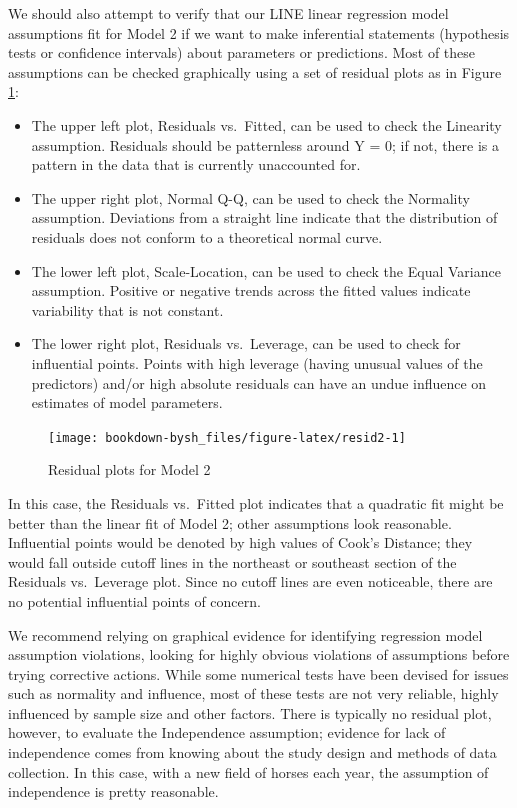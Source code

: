\documentclass[
]{krantz}
\providecommand{\tightlist}{%
  \setlength{\itemsep}{0pt}\setlength{\parskip}{0pt}}
\begin{document}
We should also attempt to verify that our LINE linear regression model assumptions fit for Model 2 if we want to make inferential statements (hypothesis tests or confidence intervals) about parameters or predictions. Most of these assumptions can be checked graphically using a set of residual plots as in Figure \ref{fig:resid2}:

\begin{itemize}
\tightlist
\item
  The upper left plot, Residuals vs.~Fitted, can be used to check the Linearity assumption. Residuals should be patternless around Y = 0; if not, there is a pattern in the data that is currently unaccounted for.
\item
  The upper right plot, Normal Q-Q, can be used to check the Normality assumption. Deviations from a straight line indicate that the distribution of residuals does not conform to a theoretical normal curve.
\item
  The lower left plot, Scale-Location, can be used to check the Equal Variance assumption. Positive or negative trends across the fitted values indicate variability that is not constant.
\item
  The lower right plot, Residuals vs.~Leverage, can be used to check for influential points. Points with high leverage (having unusual values of the predictors) and/or high absolute residuals can have an undue influence on estimates of model parameters.
\end{itemize}

\begin{figure}

{\centering \texttt{[image: bookdown-bysh\_files/figure-latex/resid2-1]} 

}

\caption{Residual plots for Model 2}\label{fig:resid2}
\end{figure}

In this case, the Residuals vs.~Fitted plot indicates that a quadratic fit might be better than the linear fit of Model 2; other assumptions look reasonable. Influential points would be denoted by high values of Cook's Distance; they would fall outside cutoff lines in the northeast or southeast section of the Residuals vs.~Leverage plot. Since no cutoff lines are even noticeable, there are no potential influential points of concern.

We recommend relying on graphical evidence for identifying regression model assumption violations, looking for highly obvious violations of assumptions before trying corrective actions. While some numerical tests have been devised for issues such as normality and influence, most of these tests are not very reliable, highly influenced by sample size and other factors. There is typically no residual plot, however, to evaluate the Independence assumption; evidence for lack of independence comes from knowing about the study design and methods of data collection. In this case, with a new field of horses each year, the assumption of independence is pretty reasonable.
\end{document}
